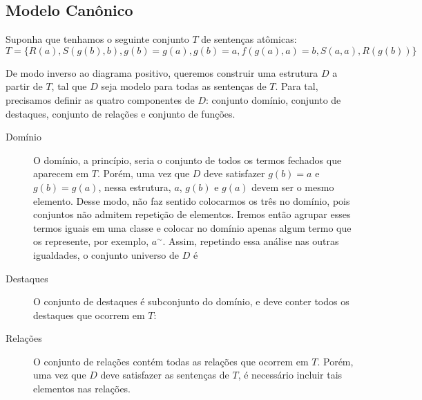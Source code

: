 \subsection{Modelo Canônico}
Suponha que tenhamos o seguinte conjunto $T$ de sentenças atômicas:
\[T = \{R(a), S(g(b), b), g(b) = g(a), g(b) = a, f(g(a),a) = b, S(a,a), R(g(b))\}\]

De modo inverso ao diagrama positivo, queremos construir uma estrutura $D$ a partir de $T$, tal que $D$ seja modelo para todas as sentenças de $T$. Para tal, precisamos definir as quatro componentes de $D$: conjunto domínio, conjunto de destaques, conjunto de relações e conjunto de funções.

\begin{description}
    \item[Domínio] O domínio, a princípio, seria o conjunto de todos os termos fechados que aparecem em $T$. Porém, uma vez que $D$ deve satisfazer $g(b) = a$ e $g(b) = g(a)$, nessa estrutura, $a$, $g(b)$ e $g(a)$ devem ser o mesmo elemento. Desse modo, não faz sentido colocarmos os três no domínio, pois conjuntos não admitem repetição de elementos. Iremos então agrupar esses termos iguais em uma classe e colocar no domínio apenas algum termo que os represente, por exemplo, $a^\sim$. Assim, repetindo essa análise nas outras igualdades, o conjunto universo de $D$ é
    \begin{center}
    \end{center}
    \item[Destaques] O conjunto de destaques é subconjunto do domínio, e deve conter todos os destaques que ocorrem em $T$:
    \begin{center}
    \end{center}
    \item[Relações] O conjunto de relações contém todas as relações que ocorrem em $T$. Porém, uma vez que $D$ deve satisfazer as sentenças de $T$, é necessário incluir tais elementos nas relações.
    \begin{center}
\end{center}
\end{description}
